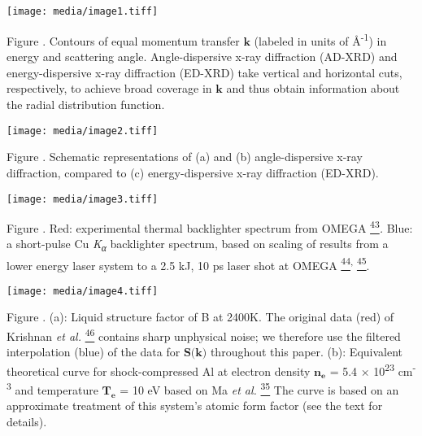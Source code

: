 \subsection{}\label{section-1}

\subsection{}\label{section-2}

\subsection{}\label{section-3}

\texttt{[image: media/image1.tiff]}

Figure . Contours of equal momentum transfer \(\mathbf{k}\) (labeled in
units of Å\textsuperscript{-1}) in energy and scattering angle.
Angle-dispersive x-ray diffraction (AD-XRD) and energy-dispersive x-ray
diffraction (ED-XRD) take vertical and horizontal cuts, respectively, to
achieve broad coverage in \(\mathbf{k}\) and thus obtain information
about the radial distribution function.

\texttt{[image: media/image2.tiff]}

Figure . Schematic representations of (a) and (b) angle-dispersive x-ray
diffraction, compared to (c) energy-dispersive x-ray diffraction
(ED-XRD).

\texttt{[image: media/image3.tiff]}

Figure . Red: experimental thermal
backlighter spectrum from OMEGA
\hyperref[b.-yaakobi-2012-private-communication.]{\textsuperscript{43}}\emph{.}
Blue: a short-pulse Cu \emph{K\textsubscript{α}} backlighter spectrum,
based on scaling of results from a lower energy laser system to a 2.5
kJ, 10 ps laser shot at OMEGA
\hyperref[p.-m.-nilson-2012-private-communication.]{\textsuperscript{44}}\textsuperscript{,}
\hyperref[k.-u.-akli-et-al.-physics-of-plasmas-14-023102-2007.]{\textsuperscript{45}}\hyperref[b.-a.-mattern-g.-t.-seidler-j.-j.-kas-j.-i.-pacold-and-j.-j.-rehr-physical-review-b-85-115135-2012.]{}.

\texttt{[image: media/image4.tiff]}

Figure . (a): Liquid structure factor of B at 2400K. The original data
(red) of Krishnan \emph{et al.}
\hyperref[s.-krishnan-s.-ansell-j.-j.-felten-k.-j.-volin-and-d.-l.-price-physical-review-letters-81-586-1998.]{\textsuperscript{46}}
contains sharp unphysical noise; we therefore use the filtered
interpolation (blue) of the data for
\(\mathbf{S}\mathbf{(}\mathbf{k}\mathbf{)}\) throughout this paper. (b):
Equivalent theoretical curve for shock-compressed Al at electron density
\(\mathbf{n}_{\mathbf{e}}\) = 5.4 × 10\textsuperscript{23}
cm\textsuperscript{-3} and temperature \(\mathbf{T}_{\mathbf{e}}\) = 10
eV based on Ma \emph{et al.}
\hyperref[t.-ma-et-al.-physical-review-letters-110-065001-2013.]{\textsuperscript{35}}
The curve is based on an approximate treatment of this system's atomic
form factor (see the text for details).

